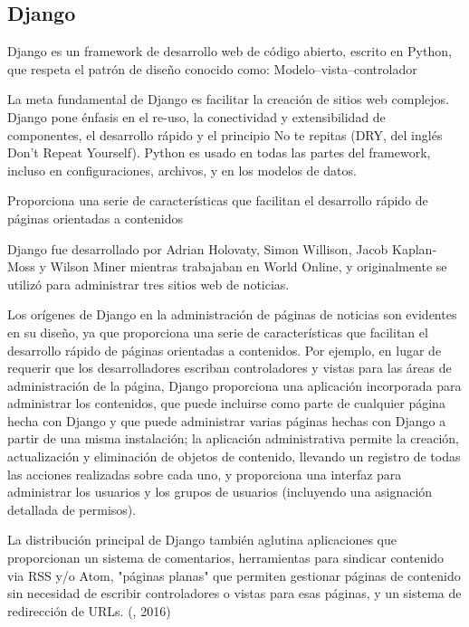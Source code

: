 \subsection{Django}
\setlength{\parskip}{5mm}
Django es un framework de desarrollo web de código abierto, escrito en Python, que respeta el patrón de diseño conocido como: Modelo–vista–controlador

La meta fundamental de Django es facilitar la creación de sitios web complejos. Django pone énfasis en el re-uso, la conectividad y extensibilidad de componentes, el desarrollo rápido y el principio No te repitas (DRY, del inglés Don't Repeat Yourself). Python es usado en todas las partes del framework, incluso en configuraciones, archivos, y en los modelos de datos.

Proporciona una serie de características que facilitan el desarrollo rápido de páginas orientadas a contenidos

Django fue desarrollado por Adrian Holovaty, Simon Willison, Jacob Kaplan-Moss y Wilson Miner mientras trabajaban en World Online, y originalmente se utilizó para administrar tres sitios web de noticias.

Los orígenes de Django en la administración de páginas de noticias son evidentes en su diseño, ya que proporciona una serie de características que facilitan el desarrollo rápido de páginas orientadas a contenidos. Por ejemplo, en lugar de requerir que los desarrolladores escriban controladores y vistas para las áreas de administración de la página, Django proporciona una aplicación incorporada para administrar los contenidos, que puede incluirse como parte de cualquier página hecha con Django y que puede administrar varias páginas hechas con Django a partir de una misma instalación; la aplicación administrativa permite la creación, actualización y eliminación de objetos de contenido, llevando un registro de todas las acciones realizadas sobre cada uno, y proporciona una interfaz para administrar los usuarios y los grupos de usuarios (incluyendo una asignación detallada de permisos).

La distribución principal de Django también aglutina aplicaciones que proporcionan un sistema de comentarios, herramientas para sindicar contenido via RSS y/o Atom, "páginas planas" que permiten gestionar páginas de contenido sin necesidad de escribir controladores o vistas para esas páginas, y un sistema de redirección de URLs. (\citet{djangobib}, 2016) 

